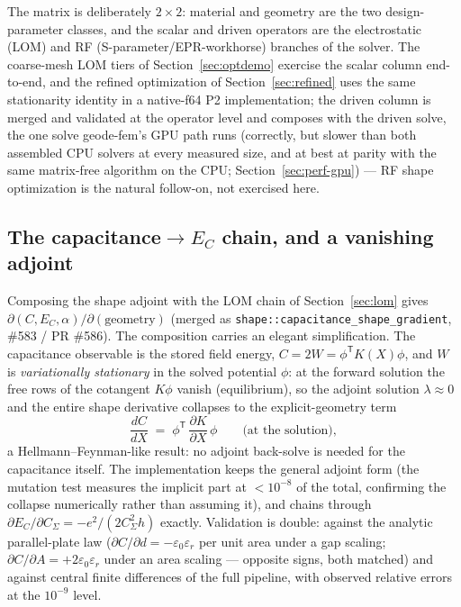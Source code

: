 \documentclass{anvil-paper}
\begin{document}
The matrix is deliberately $2\times 2$: material and geometry are the two
design-parameter classes, and the scalar and driven operators are the
electrostatic (LOM) and RF (S-parameter/EPR-workhorse) branches of the
solver. The coarse-mesh LOM tiers of Section~\ref{sec:optdemo} exercise
the scalar column end-to-end, and the refined optimization of
Section~\ref{sec:refined} uses the same stationarity identity in a
native-f64 P2 implementation; the driven column is merged and validated at
the operator level and composes with the driven solve, the one solve
geode-fem's GPU path runs (correctly, but slower than both assembled CPU
solvers at every measured size, and at best at parity with the same
matrix-free algorithm on the CPU; Section~\ref{sec:perf-gpu}) --- RF shape optimization is
the natural follow-on, not exercised here.

\subsection{The \texorpdfstring{capacitance$\to E_C$}{capacitance-to-E\_C} chain, and a vanishing adjoint}
\label{sec:chain}

Composing the shape adjoint with the LOM chain of Section~\ref{sec:lom}
gives $\partial(C, E_C, \alpha)/\partial(\text{geometry})$ (merged as
\texttt{shape::capacitance\_shape\_gradient}, \#583 / PR \#586). The
composition carries an elegant simplification. The capacitance observable
is the stored field energy, $C = 2W = \phi^{\mathsf{T}}K(X)\phi$, and $W$
is \emph{variationally stationary} in the solved potential $\phi$: at the
forward solution the free rows of the cotangent $K\phi$ vanish
(equilibrium), so the adjoint solution $\lambda \approx 0$ and the entire
shape derivative collapses to the explicit-geometry term
\begin{equation}
  \frac{dC}{dX}
  \;=\; \phi^{\mathsf{T}}\,\frac{\partial K}{\partial X}\,\phi
  \qquad\text{(at the solution)},
  \label{eq:hf}
\end{equation}
a Hellmann--Feynman-like result: no adjoint back-solve is needed for the
capacitance itself. The implementation keeps the general adjoint form
(the mutation test measures the implicit part at $<10^{-8}$ of the
total, confirming the collapse numerically rather than assuming it), and
chains through $\partial E_C/\partial C_\Sigma = -e^2/(2C_\Sigma^2 h)$
exactly. Validation is double: against the analytic parallel-plate law
($\partial C/\partial d = -\varepsilon_0\varepsilon_r$ per unit area
under a gap scaling; $\partial C/\partial A = +2\varepsilon_0
\varepsilon_r$ under an area scaling --- opposite signs, both matched)
and against central finite differences of the full pipeline, with
observed relative errors at the $10^{-9}$ level.
\end{document}
